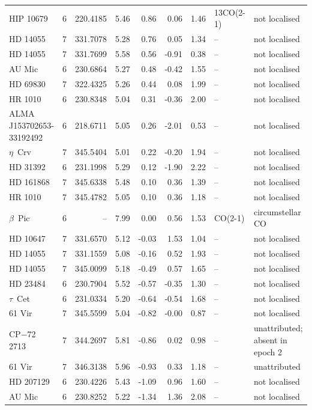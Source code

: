 \begin{tabular}{@{}l@{~}c@{~}r@{~}r@{~}r@{~}r@{~}r@{~}l@{~}l@{}}
HIP 10679 & 6 & 220.4185 & 5.46 & 0.86 & 0.06 & 1.46 & 13CO(2-1) & not localised \\
HD 14055 & 7 & 331.7078 & 5.28 & 0.76 & 0.05 & 1.34 & -- & not localised \\
HD 14055 & 7 & 331.7699 & 5.58 & 0.56 & -0.91 & 0.38 & -- & not localised \\
AU Mic & 6 & 230.6864 & 5.27 & 0.48 & -0.42 & 1.55 & -- & not localised \\
HD 69830 & 7 & 322.4325 & 5.26 & 0.44 & 0.08 & 1.99 & -- & not localised \\
HR 1010 & 6 & 230.8348 & 5.04 & 0.31 & -0.36 & 2.00 & -- & not localised \\
ALMA J153702653-33192492 & 6 & 218.6711 & 5.05 & 0.26 & -2.01 & 0.53 & -- & not localised \\
$\eta$~Crv & 7 & 345.5404 & 5.01 & 0.22 & -0.20 & 1.94 & -- & not localised \\
HD 31392 & 6 & 231.1998 & 5.29 & 0.12 & -1.90 & 2.22 & -- & not localised \\
HD 161868 & 7 & 345.6338 & 5.48 & 0.10 & 0.36 & 1.39 & -- & not localised \\
HR 1010 & 7 & 345.4782 & 5.05 & 0.10 & 0.36 & 1.18 & -- & not localised \\
$\beta$~Pic & 6 & -- & 7.99 & 0.00 & 0.56 & 1.53 & CO(2-1) & circumstellar CO \\
HD 10647 & 7 & 331.6570 & 5.12 & -0.03 & 1.53 & 1.04 & -- & not localised \\
HD 14055 & 7 & 331.1559 & 5.08 & -0.16 & 0.52 & 1.93 & -- & not localised \\
HD 14055 & 7 & 345.0099 & 5.18 & -0.49 & 0.57 & 1.65 & -- & not localised \\
HD 23484 & 6 & 230.7904 & 5.52 & -0.57 & -0.35 & 1.30 & -- & not localised \\
$\tau$~Cet & 6 & 231.0334 & 5.20 & -0.64 & -0.54 & 1.68 & -- & not localised \\
61 Vir & 7 & 345.5599 & 5.04 & -0.82 & -0.00 & 0.87 & -- & not localised \\
CP$-$72 2713 & 7 & 344.2697 & 5.81 & -0.86 & 0.02 & 0.98 & -- & unattributed; absent in epoch 2 \\
61 Vir & 7 & 346.3138 & 5.96 & -0.93 & 0.33 & 1.18 & -- & unattributed \\
HD 207129 & 6 & 230.4226 & 5.43 & -1.09 & 0.96 & 1.60 & -- & not localised \\
AU Mic & 6 & 230.8252 & 5.22 & -1.34 & 1.36 & 2.08 & -- & not localised \\

\end{tabular}
